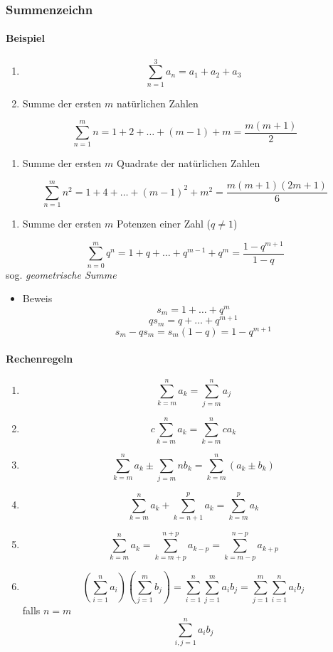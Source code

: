 \documentclass[a4paper]{scrartcl}
\begin{document}
\subsubsection{Summenzeichn}
\label{sec-2-1-1}
\paragraph{Beispiel}
\label{sec-2-1-1-1}
\begin{enumerate}
\item \[\sum_{n=1}^3a_n=a_1 + a_2 + a_3\]
\item Summe der ersten $m$ natürlichen Zahlen
\end{enumerate}
\[\sum_{n=1}^{m}n = 1 + 2 + \ldots + \left(m -1\right) + m = \frac{m (m + 1)}{2}\]
\begin{enumerate}
\item Summe der ersten $m$ Quadrate der natürlichen Zahlen
\end{enumerate}
\[\sum_{n=1}^m n^2 = 1 + 4 + \ldots + \left(m-1\right)^2 + m^2 = \frac{m(m+1)(2m+1)}{6}\]
\begin{enumerate}
\item Summe der ersten $m$ Potenzen einer Zahl ($q \neq 1$)
\end{enumerate}
\[\sum_{n=0}^m q^n = 1+q+\dots+q^{m-1}+q^m = \frac{1 - q^{m + 1}}{1-q}\]
sog. \emph{geometrische Summe}
\begin{itemize}
\item Beweis
\[s_m = 1 + \ldots + q^m\]
\[q s_m = q + \ldots + q^{m+1}\]
\[s_m - q s_m = s_m\left(1-q\right) = 1-q^{m+1}\]
\end{itemize}

\paragraph{Rechenregeln}
\label{sec-2-1-1-2}
\begin{enumerate}
\item \[\sum_{k=m}^n a_k = \sum_{j=m}^n a_j\]
\item \[c\sum_{k=m}^n a_k = \sum_{k=m}^n c a_k\]
\item \[\sum_{k=m}^n a_k \pm \sum_{j=m}{n} b_k = \sum_{k=m}^n \left(a_k \pm b_k\right)\]
\item \[\sum_{k=m}^n a_k + \sum_{k=n+1}^p a_k = \sum_{k=m}^{p} a_k\]
\item \[\sum_{k=m}^n a_k = \sum_{k=m+p}^{n+p} a_{k-p} = \sum_{k=m-p}^{n-p} a_{k+p}\]
\item \[\left(\sum_{i=1}^n a_i\right)(\sum_{j=1}^m b_j) = \sum_{i=1}^n \sum_{j=1}^m a_i b_j = \sum_{j=1}^m \sum_{i=1}^n a_i b_j\]
                   falls $n=m$ \[\sum_{i,j=1}^n a_i b_j\]
\end{enumerate}
\end{document}
